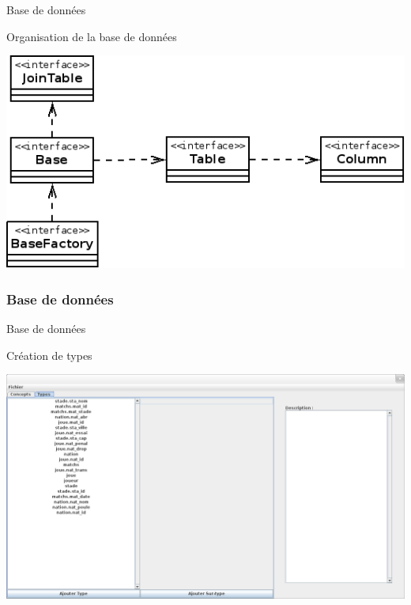 \documentclass[8pt]{beamer}
\begin{document}
\begin{frame}{Base de données}
\begin{block}{Organisation de la base de données}
\begin{center}
\includegraphics[scale=0.3]{db_presentation.png}
\end{center}
\end{block}
\end{frame}

\subsubsection{Base de données}
\begin{frame}{Base de données}
\begin{block}{Création de types}
\begin{center}
\includegraphics[scale=0.2]{creation_types.png}
\end{center}
\end{block}
\end{frame}
\end{document}
